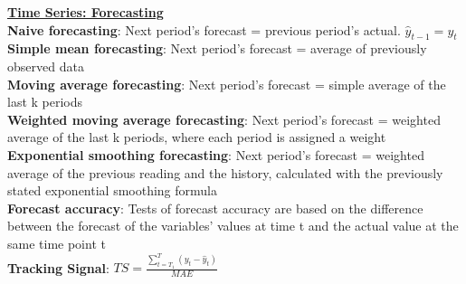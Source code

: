 \documentclass[a4paper,7pt,landscape]{extarticle}
\begin{document}
\begin{multicols}{3}
\begin{boxA}
\underline{\textbf{Time Series: Forecasting}}\\
\textbf{Naive forecasting}: Next period's forecast = previous period's actual. $\hat{y}_{t-1} = y_t$\\
\textbf{Simple mean forecasting}: Next period's forecast = average of previously observed data\\
\textbf{Moving average forecasting}: Next period's forecast = simple average of the last k periods\\
\textbf{Weighted moving average forecasting}: Next period's forecast = weighted average of the last k periods, where each period is assigned a weight\\
\textbf{Exponential smoothing forecasting}: Next period’s forecast = weighted average of the previous reading and the history, calculated with the previously stated exponential smoothing formula\\
\textbf{Forecast accuracy}: Tests of forecast accuracy are based on the difference between the forecast of the variables’ values at time t and the actual value at the same time point t\\
\textbf{Tracking Signal}: $TS = \frac{\sum_{t=T_1}^T (y_t - \hat{y}_t)}{MAE}$
\end{boxA}


\end{multicols}
\end{document}

